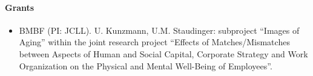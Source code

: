 \begin{bibunit}[apalike]
\nocite{*}
\putbib[profUteKuzmann1]
\end{bibunit}



\paragraph{Grants}

\begin{itemize}
	\item BMBF (PI: JCLL). U. Kunzmann, U.M. Staudinger: subproject ``Images of Aging'' within the joint research project ``Effects of Matches/Mismatches between Aspects of Human and Social Capital, Corporate Strategy and Work Organization on the Physical and Mental Well-Being of Employees''. 
\end{itemize}

